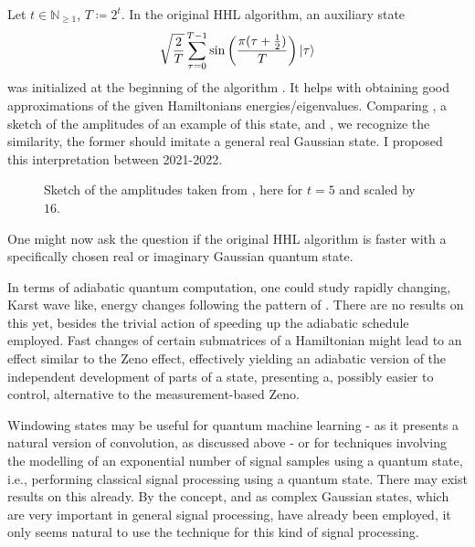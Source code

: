 \documentclass[10pt]{amsart}
\theoremstyle{definition}
\theoremstyle{remark}
\begin{document}
    \phantom{}

    Let \(t \in \mathbb{N}_{\geq 1}\), \(T \coloneqq 2^t\). In the original HHL algorithm, an auxiliary state
    \begin{align}
        \sqrt{\frac{2}{T}}\sum_{\tau=0}^{T-1} \sin\left(\frac{\pi(\tau+\frac{1}{2})}{T}\right)\ket{\tau}
    \end{align}
    was initialized at the beginning of the algorithm \cite[p. 2]{Harrow}. It helps with obtaining good approximations of the given Hamiltonians energies/eigenvalues. Comparing , a sketch of the amplitudes of an example of this state, and , we recognize the similarity, the former should imitate a general real Gaussian state. I proposed this interpretation between 2021-2022.
    
    \begin{figure}[!hbtp]
        \centering
        \caption{Sketch of the amplitudes taken from \cite[p. 31]{valentinpi}, here for \(t = 5\) and scaled by \(16\).}
        \label{sketch_of_the_amplitudes}
    \end{figure}

    One might now ask the question if the original HHL algorithm is faster with a specifically chosen real or imaginary Gaussian quantum state.

    \phantom{}

    In terms of adiabatic quantum computation, one could study rapidly changing, Karst wave like, energy changes following the pattern of . There are no results on this yet, besides the trivial action of speeding up the adiabatic schedule employed. Fast changes of certain submatrices of a Hamiltonian might lead to an effect similar to the Zeno effect, effectively yielding an adiabatic version of the independent development of parts of a state, presenting a, possibly easier to control, alternative to the measurement-based Zeno.

    \phantom{}

    Windowing states may be useful for quantum machine learning - as it presents a natural version of convolution, as discussed above - or for techniques involving the modelling of an exponential number of signal samples using a quantum state, i.e., performing classical signal processing using a quantum state. There may exist results on this already. By the concept, and as complex Gaussian states, which are very important in general signal processing, have already been employed, it only seems natural to use the technique for this kind of signal processing.
\end{document}
